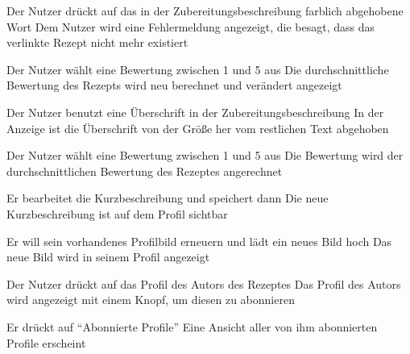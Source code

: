 {Der Nutzer drückt auf das in der Zubereitungsbeschreibung farblich abgehobene Wort}
{Dem Nutzer wird eine Fehlermeldung angezeigt, die besagt, dass das verlinkte Rezept nicht mehr existiert}


{Der Nutzer wählt eine Bewertung zwischen 1 und 5 aus}
{Die durchschnittliche Bewertung des Rezepts wird neu berechnet und verändert angezeigt}



{Der Nutzer benutzt eine Überschrift in der Zubereitungsbeschreibung}
{In der Anzeige ist die Überschrift von der Größe her vom restlichen Text abgehoben}


{Der Nutzer wählt eine Bewertung zwischen 1 und 5 aus}
{Die Bewertung wird der durchschnittlichen Bewertung des Rezeptes angerechnet}




{Er bearbeitet die Kurzbeschreibung und speichert dann}
{Die neue Kurzbeschreibung ist auf dem Profil sichtbar}

{Er will sein vorhandenes Profilbild erneuern und lädt ein neues Bild hoch}
{Das neue Bild wird in seinem Profil angezeigt}

{Der Nutzer drückt auf das Profil des Autors des Rezeptes}
{Das Profil des Autors wird angezeigt mit einem Knopf, um diesen zu abonnieren}

{Er drückt auf "`Abonnierte Profile"'}
{Eine Ansicht aller von ihm abonnierten Profile erscheint}

